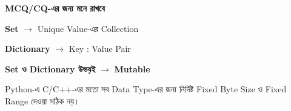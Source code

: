 \begin{rememberbox}

\textbf{\color{deepOrange}MCQ/CQ-এর জন্য মনে রাখবে}

\begin{center}

\textbf{Set}
\(\longrightarrow\)
Unique Value-এর Collection

\qquad

\textbf{Dictionary}
\(\longrightarrow\)
Key : Value Pair

\medskip

\textbf{Set ও Dictionary উভয়ই}
\(\longrightarrow\)
\textbf{Mutable}

\end{center}

\end{rememberbox}



Python-এ C/C++-এর মতো সব Data Type-এর জন্য নির্দিষ্ট
Fixed Byte Size ও Fixed Range দেওয়া সঠিক নয়।

